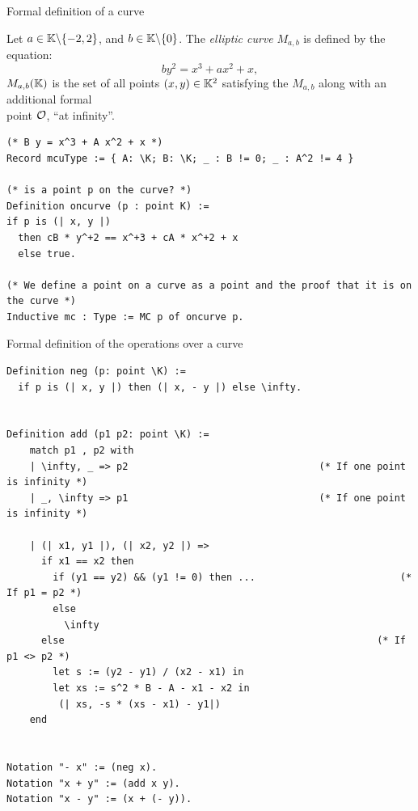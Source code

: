 \documentclass[8pt,aspectratio=169]{beamer}
\begin{document}
%
%
\begin{frame}[fragile]{Formal definition of a curve}

\begin{dfn}
  Let $a \in \mathbb{K} \backslash \{-2, 2\}$, and $b \in \mathbb{K} \backslash \{ 0\}$. The \textit{elliptic curve} $M_{a,b}$ is defined by the equation:
  $$by^2 = x^3 + ax^2 + x,$$
  $M_{a,b}(\mathbb{K})$ is the set of all points $(x,y) \in \mathbb{K}^2$ satisfying the $M_{a,b}$ along with an additional formal\\
  point $\mathcal{O}$, ``at infinity''.
\end{dfn}

\begin{center}
\begin{lstlisting}[language=Coq, basicstyle=\normalsize]
(* B y = x^3 + A x^2 + x *)
Record mcuType := { A: \K; B: \K; _ : B != 0; _ : A^2 != 4 }

(* is a point p on the curve? *)
Definition oncurve (p : point K) :=
if p is (| x, y |)
  then cB * y^+2 == x^+3 + cA * x^+2 + x
  else true.

(* We define a point on a curve as a point and the proof that it is on the curve *)
Inductive mc : Type := MC p of oncurve p.
\end{lstlisting}
\end{center}
\end{frame}


%
%
\begin{frame}[fragile]{Formal definition of the operations over a curve}
\begin{center}
\begin{lstlisting}[language=Coq, basicstyle=\normalsize]
Definition neg (p: point \K) :=
  if p is (| x, y |) then (| x, - y |) else \infty.


Definition add (p1 p2: point \K) :=
    match p1 , p2 with
    | \infty, _ => p2                                 (* If one point is infinity *)
    | _, \infty => p1                                 (* If one point is infinity *)

    | (| x1, y1 |), (| x2, y2 |) =>
      if x1 == x2 then
        if (y1 == y2) && (y1 != 0) then ...                         (* If p1 = p2 *)
        else
          \infty
      else                                                      (* If p1 <> p2 *)
        let s := (y2 - y1) / (x2 - x1) in
        let xs := s^2 * B - A - x1 - x2 in
         (| xs, -s * (xs - x1) - y1|)
    end


Notation "- x" := (neg x).
Notation "x + y" := (add x y).
Notation "x - y" := (x + (- y)).
\end{lstlisting}
\end{center}
\end{frame}
\end{document}
